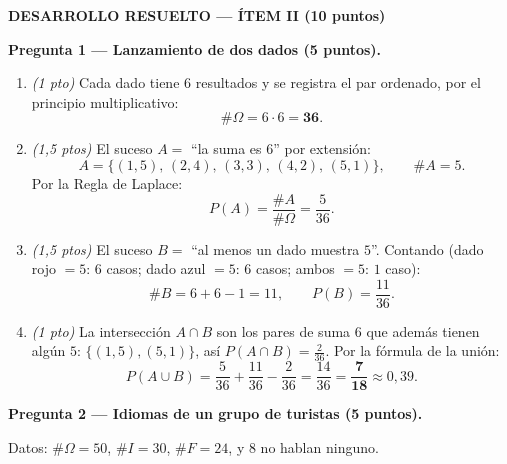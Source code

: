 \documentclass[12pt, a4paper]{article}
\begin{document}
\newpage

\centerline{\textbf{DESARROLLO RESUELTO — ÍTEM II (10 puntos)}}
\vspace{0.4cm}

\noindent\textbf{Pregunta 1 — Lanzamiento de dos dados (5 puntos).}
\vspace{0.2cm}

\begin{enumerate}[label=\alph*), leftmargin=*, itemsep=6pt]
    \item \textit{(1 pto)} Cada dado tiene $6$ resultados y se registra el par ordenado, por el principio multiplicativo:
    \[ \#\Omega = 6 \cdot 6 = \mathbf{36}. \]

    \item \textit{(1,5 ptos)} El suceso $A = $ ``la suma es $6$'' por extensión:
    \[ A = \{(1,5),\,(2,4),\,(3,3),\,(4,2),\,(5,1)\}, \qquad \#A = 5. \]
    Por la Regla de Laplace:
    \[ P(A) = \frac{\#A}{\#\Omega} = \frac{5}{36}. \]

    \item \textit{(1,5 ptos)} El suceso $B = $ ``al menos un dado muestra $5$''. Contando (dado rojo $=5$: $6$ casos; dado azul $=5$: $6$ casos; ambos $=5$: $1$ caso):
    \[ \#B = 6 + 6 - 1 = 11, \qquad P(B) = \frac{11}{36}. \]

    \item \textit{(1 pto)} La intersección $A \cap B$ son los pares de suma $6$ que además tienen algún $5$: $\{(1,5),(5,1)\}$, así $P(A \cap B) = \tfrac{2}{36}$. Por la fórmula de la unión:
    \[ P(A \cup B) = \frac{5}{36} + \frac{11}{36} - \frac{2}{36} = \frac{14}{36} = \mathbf{\frac{7}{18}} \approx 0{,}39. \]
\end{enumerate}

\vspace{0.6cm}

\noindent\textbf{Pregunta 2 — Idiomas de un grupo de turistas (5 puntos).}
\vspace{0.2cm}

\noindent Datos: $\#\Omega = 50$, $\#I = 30$, $\#F = 24$, y $8$ no hablan ninguno.
\end{document}
